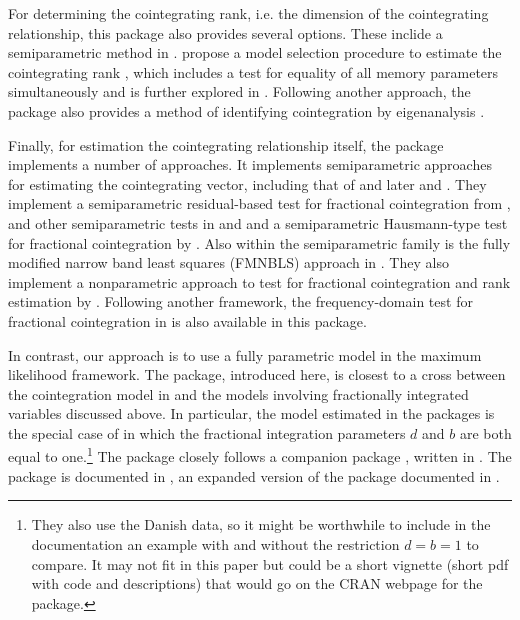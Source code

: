 \documentclass[article]{jss}
\begin{document}
For determining the cointegrating rank, i.e. the dimension of the cointegrating relationship, this package also provides several options. 
These inclide a semiparametric method in \citet{ChenHurvich2003}. 
\citet{RobinsonYajima2002} propose a model selection procedure to estimate the cointegrating rank ,
which includes a test for equality of all memory parameters simultaneously and is further explored in \citet{NielsenShimotsu2007}. 
Following another approach, the package also provides a method of
identifying cointegration by eigenanalysis \citep{ZhangRobinsonYao2018}. 


Finally, for estimation the cointegrating relationship itself, the  package implements a number of approaches. 
It implements semiparametric approaches for estimating the cointegrating vector, including that of 
\citet{Robinson1994} and later \citet{RobinsonMarinucci2003} and \citet{ChristensenNielsen2006}. 
They implement a semiparametric residual-based test for fractional cointegration from \citet{ChenHurvich2006}, 
and other semiparametric tests in \citet{MarmolVelasco2004}and \citet{WangWangChan2015}
and a semiparametric Hausmann-type test for fractional cointegration by \citet{Robinson2008}. 
Also within the semiparametric family is the fully modified narrow band least squares (FMNBLS) approach in  \citet{NielsenFrederiksen2011}. 
% 
They also implement a nonparametric approach to test for fractional cointegration and rank estimation by \citet{Nielsen2010}.
Following another framework, the frequency-domain test for fractional cointegration in \citet{SouzaEtal2018} is also available in this package. 

In contrast, our approach is to use a fully parametric model in the maximum likelihood framework. 
The  package, introduced here, is closest to a cross between the \citet{Johansen1995} cointegration model in  and the models involving fractionally integrated variables discussed above. 
In particular, the model estimated in the  packages is the special case of  in which the fractional integration parameters $d$ and $b$ are both equal to one.\footnote{They also use the Danish data, so it might be worthwhile to include in the documentation an example with and without the restriction $d = b = 1$ to compare. It may not fit in this paper but could be a short vignette (short pdf with code and descriptions) that would go on the CRAN webpage for the package. } 
% 
% 
% 
The  package  closely follows a companion package , written in . 
The  package is documented in \cite{Nielsen2016}, an expanded version of the package documented in \cite{Nielsen2013}. 
\end{document}
